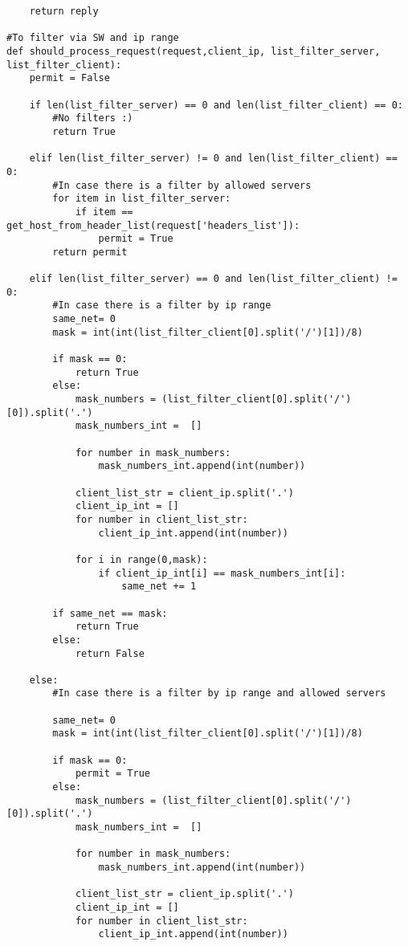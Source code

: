 \begin{verbatim}
    return reply

#To filter via SW and ip range
def should_process_request(request,client_ip, list_filter_server, list_filter_client):
    permit = False

    if len(list_filter_server) == 0 and len(list_filter_client) == 0:
        #No filters :)
        return True

    elif len(list_filter_server) != 0 and len(list_filter_client) == 0:
        #In case there is a filter by allowed servers
        for item in list_filter_server:
            if item == get_host_from_header_list(request['headers_list']):
                permit = True
        return permit

    elif len(list_filter_server) == 0 and len(list_filter_client) != 0:
        #In case there is a filter by ip range
        same_net= 0
        mask = int(int(list_filter_client[0].split('/')[1])/8)

        if mask == 0:
            return True
        else:
            mask_numbers = (list_filter_client[0].split('/')[0]).split('.')
            mask_numbers_int =  []

            for number in mask_numbers:
                mask_numbers_int.append(int(number))

            client_list_str = client_ip.split('.')
            client_ip_int = []
            for number in client_list_str:
                client_ip_int.append(int(number))

            for i in range(0,mask):
                if client_ip_int[i] == mask_numbers_int[i]:
                    same_net += 1

        if same_net == mask:
            return True
        else:
            return False

    else: 
        #In case there is a filter by ip range and allowed servers

        same_net= 0
        mask = int(int(list_filter_client[0].split('/')[1])/8)

        if mask == 0:
            permit = True
        else:
            mask_numbers = (list_filter_client[0].split('/')[0]).split('.')
            mask_numbers_int =  []

            for number in mask_numbers:
                mask_numbers_int.append(int(number))

            client_list_str = client_ip.split('.')
            client_ip_int = []
            for number in client_list_str:
                client_ip_int.append(int(number))


\end{verbatim}
